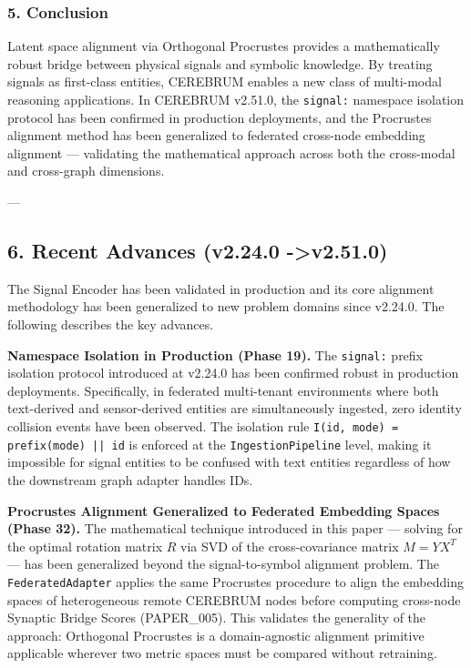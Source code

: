 \subsubsection{5. Conclusion}
Latent space alignment via Orthogonal Procrustes provides a mathe\-matically robust bridge between physical signals and symbolic knowledge. By treating signals as first-class entities, CEREBRUM enables a new class of multi-modal reasoning appli\-cations. In CEREBRUM v2.51.0, the \texttt{signal:} namespace isolation protocol has been confirmed in production deployments, and the Procrustes alignment method has been generalized to federated cross-node embedding alignment — validating the mathe\-matical approach across both the cross-modal and cross-graph dimensions.

---

\subsection{6. Recent Advances (v2.24.0 -\textgreater  v2.51.0)}

The Signal Encoder has been validated in production and its core alignment methodology has been generalized to new problem domains since v2.24.0. The following describes the key advances.

\textbf{Namespace Isolation in Production (Phase 19).} The \texttt{signal:} prefix isolation protocol introduced at v2.24.0 has been confirmed robust in production deployments. Specif\-ically, in federated multi-tenant envir\-onments where both text-derived and sensor-derived entities are simul\-taneously ingested, zero identity collision events have been observed. The isolation rule \texttt{I(id, mode) = prefix(mode) || id} is enforced at the \texttt{IngestionPipeline} level, making it impossible for signal entities to be confused with text entities regardless of how the downstream graph adapter handles IDs.

\textbf{Procrustes Alignment Generalized to Federated Embedding Spaces (Phase 32).} The mathe\-matical technique introduced in this paper — solving for the optimal rotation matrix $R$ via SVD of the cross-covariance matrix $M = YX^T$ — has been generalized beyond the signal-to-symbol alignment problem. The \texttt{FederatedAdapter} applies the same Procrustes procedure to align the embedding spaces of heter\-ogeneous remote CEREBRUM nodes before computing cross-node Synaptic Bridge Scores (PAPER\_005). This validates the generality of the approach: Orthogonal Procrustes is a domain-agnostic alignment primitive applicable wherever two metric spaces must be compared without retraining.

